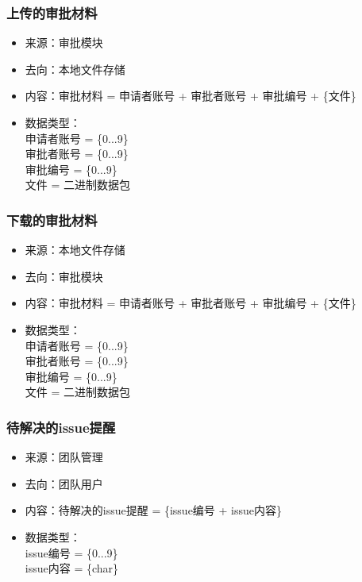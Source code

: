             \subsubsection{\color{red} 上传的审批材料}
            \begin{itemize}
            \item 来源：审批模块
            \item 去向：本地文件存储
            \item 内容：审批材料 = 申请者账号 + 审批者账号 + 审批编号 + \{文件\}
            \item 数据类型：\\
            申请者账号 = \{0...9\}\\
            审批者账号 = \{0...9\}\\
            审批编号 = \{0...9\}\\
            文件 = 二进制数据包\\
            \end{itemize}

            \subsubsection{\color{red} 下载的审批材料}
            \begin{itemize}
            \item 来源：本地文件存储
            \item 去向：审批模块
            \item 内容：审批材料 = 申请者账号 + 审批者账号 + 审批编号 + \{文件\}
            \item 数据类型：\\
            申请者账号 = \{0...9\}\\
            审批者账号 = \{0...9\}\\
            审批编号 = \{0...9\}\\
            文件 = 二进制数据包\\
            \end{itemize}

            \subsubsection{\color{red} 待解决的issue提醒}
            \begin{itemize}
            \item 来源：团队管理
            \item 去向：团队用户
            \item 内容：待解决的issue提醒 = \{issue编号 + issue内容\} 
            \item 数据类型：\\
            issue编号 = \{0...9\}\\
            issue内容 = \{char\}\\
            \end{itemize}
            
